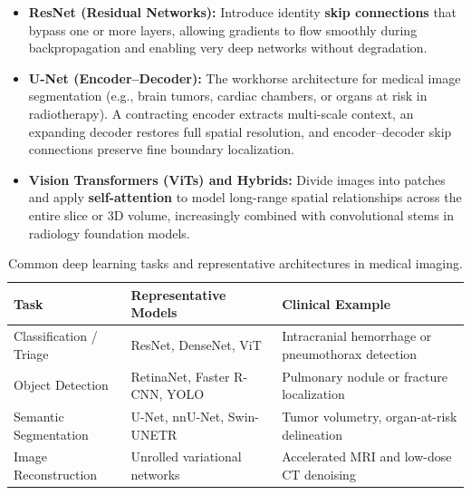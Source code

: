 \begin{itemize}
    \item \textbf{ResNet (Residual Networks):} Introduce identity \textbf{skip connections} that bypass one or more layers, allowing gradients to flow smoothly during backpropagation and enabling very deep networks without degradation.
    \item \textbf{U-Net (Encoder--Decoder):} The workhorse architecture for medical image segmentation (e.g., brain tumors, cardiac chambers, or organs at risk in radiotherapy). A contracting encoder extracts multi-scale context, an expanding decoder restores full spatial resolution, and encoder--decoder skip connections preserve fine boundary localization.
    \item \textbf{Vision Transformers (ViTs) and Hybrids:} Divide images into patches and apply \textbf{self-attention} to model long-range spatial relationships across the entire slice or 3D volume, increasingly combined with convolutional stems in radiology foundation models.
\end{itemize}

\begin{table}[ht]
\centering
\caption{Common deep learning tasks and representative architectures in medical imaging.}
\label{tab:dl_architectures}
\begin{tabular}{@{}p{}p{}p{}@{}}
\toprule
\textbf{Task} & \textbf{Representative Models} & \textbf{Clinical Example} \\
\midrule
Classification / Triage & ResNet, DenseNet, ViT & Intracranial hemorrhage or pneumothorax detection \\
Object Detection & RetinaNet, Faster R-CNN, YOLO & Pulmonary nodule or fracture localization \\
Semantic Segmentation & U-Net, nnU-Net, Swin-UNETR & Tumor volumetry, organ-at-risk delineation \\
Image Reconstruction & Unrolled variational networks & Accelerated MRI and low-dose CT denoising \\
\bottomrule
\end{tabular}
\end{table}


